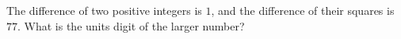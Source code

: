 The difference of two positive integers is $1$, and the difference of their squares is $77$. What is the units digit of the larger number?
